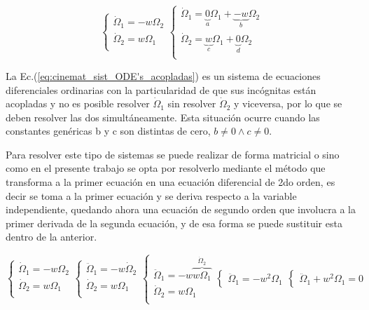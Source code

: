 \documentclass[oneside,a4paper,english,links]{amca}
\begin{document}
\begin{equation}
  \begin{cases}
    \dot{\Omega}_1=-w\Omega_2\\
    \dot{\Omega}_2=w\Omega_1\\
    \end{cases}
      \begin{cases}
    \dot{\Omega}_1=\underbrace{0}_a\Omega_1+\underbrace{-w}_b\Omega_2\\
    \dot{\Omega}_2=\underbrace{w}_c\Omega_1+\underbrace{0}_d\Omega_2\\
    \end{cases}
    \label{eq:cinemat_sist_ODE's_acopladas}
\end{equation}

La Ec.(\ref{eq:cinemat_sist_ODE's_acopladas}) es un sistema de ecuaciones diferenciales ordinarias con la particularidad de que sus inc\'ognitas est\'an acopladas y no es posible resolver $\dot{\Omega}_1$ sin resolver $\dot{\Omega}_2$ y viceversa, por lo que se deben resolver las dos simult\'aneamente. Esta situaci\'on ocurre cuando las constantes gen\'ericas b y c son distintas de cero, $b\neq0\wedge c\neq0$. 

Para resolver este tipo de sistemas se puede realizar de forma matricial o sino como en el presente trabajo se opta por resolverlo mediante el m\'etodo que transforma a la primer ecuaci\'on en una ecuaci\'on diferencial de 2do orden, es decir se toma a la primer ecuaci\'on y se deriva respecto a la variable independiente, quedando ahora una ecuaci\'on de segundo orden que involucra  a la primer derivada de la segunda ecuaci\'on, y de esa forma se puede sustituir esta dentro de la anterior.

\begin{equation}
  \begin{cases}
    \dot{\Omega}_1=-w\Omega_2\\
    \dot{\Omega}_2=w\Omega_1\\
    \end{cases}
  \begin{cases}
    \ddot{\Omega}_1=-w\dot{\Omega}_2\\
    \dot{\Omega}_2=w\Omega_1\\
    \end{cases}
  \begin{cases}
    \ddot{\Omega}_1=-w\overbrace{w\Omega_1}^{\dot{\Omega}_2}\\
    \dot{\Omega}_2=w\Omega_1\\
    \end{cases}
      \begin{cases}
    \ddot{\Omega}_1=-w^2\Omega_1
    \end{cases}
      \begin{cases}
    \ddot{\Omega}_1+w^2\Omega_1=0
    \end{cases}
    \label{eq:cinemat_sistema_eq_dif_copladas}
\end{equation}
\end{document}
